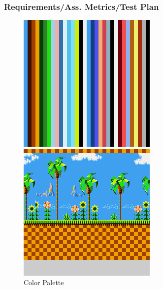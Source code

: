 \documentclass[xcolor=table]{beamer}
\begin{document}
\begin{frame}
    \frametitle{Requirements/Ass. Metrics/Test Plan}
    \begin{figure}[H]
        \centering
        \begin{minipage}[H]{0.45\linewidth}
            \centering
            \includegraphics[width=\textwidth]{../images/palette.png}
            \caption{Color Palette}
            \label{fig:palette}
        \end{minipage}
        \hfill
        \begin{minipage}[H]{0.45\linewidth}
            \centering
            \includegraphics[width=\textwidth]{../images/screen.png}

\end{minipage}
\end{figure}
\end{frame}
\end{document}
